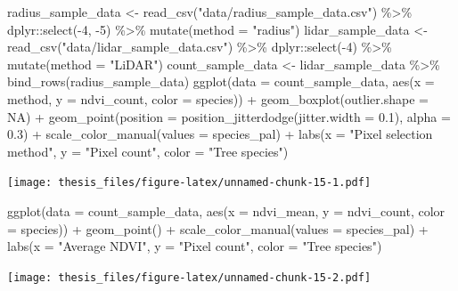 \documentclass[12pt,twoside]{reedthesis}
\newenvironment{Shaded}{\begin{snugshade}}{\end{snugshade}}
\newcommand{\AttributeTok}[1]{\textcolor[rgb]{0.77,0.63,0.00}{#1}}
\newcommand{\ConstantTok}[1]{\textcolor[rgb]{0.00,0.00,0.00}{#1}}
\newcommand{\DecValTok}[1]{\textcolor[rgb]{0.00,0.00,0.81}{#1}}
\newcommand{\FloatTok}[1]{\textcolor[rgb]{0.00,0.00,0.81}{#1}}
\newcommand{\FunctionTok}[1]{\textcolor[rgb]{0.00,0.00,0.00}{#1}}
\newcommand{\NormalTok}[1]{#1}
\newcommand{\OtherTok}[1]{\textcolor[rgb]{0.56,0.35,0.01}{#1}}
\newcommand{\SpecialCharTok}[1]{\textcolor[rgb]{0.00,0.00,0.00}{#1}}
\newcommand{\StringTok}[1]{\textcolor[rgb]{0.31,0.60,0.02}{#1}}
\begin{document}
\begin{Shaded}
\begin{Highlighting}[]
\NormalTok{radius\_sample\_data }\OtherTok{\textless{}{-}} \FunctionTok{read\_csv}\NormalTok{(}\StringTok{"data/radius\_sample\_data.csv"}\NormalTok{) }\SpecialCharTok{\%\textgreater{}\%}
\NormalTok{    dplyr}\SpecialCharTok{::}\FunctionTok{select}\NormalTok{(}\SpecialCharTok{{-}}\DecValTok{4}\NormalTok{, }\SpecialCharTok{{-}}\DecValTok{5}\NormalTok{) }\SpecialCharTok{\%\textgreater{}\%}
    \FunctionTok{mutate}\NormalTok{(}\AttributeTok{method =} \StringTok{"radius"}\NormalTok{)}
\NormalTok{lidar\_sample\_data }\OtherTok{\textless{}{-}} \FunctionTok{read\_csv}\NormalTok{(}\StringTok{"data/lidar\_sample\_data.csv"}\NormalTok{) }\SpecialCharTok{\%\textgreater{}\%}
\NormalTok{    dplyr}\SpecialCharTok{::}\FunctionTok{select}\NormalTok{(}\SpecialCharTok{{-}}\DecValTok{4}\NormalTok{) }\SpecialCharTok{\%\textgreater{}\%}
    \FunctionTok{mutate}\NormalTok{(}\AttributeTok{method =} \StringTok{"LiDAR"}\NormalTok{)}
\NormalTok{count\_sample\_data }\OtherTok{\textless{}{-}}\NormalTok{ lidar\_sample\_data }\SpecialCharTok{\%\textgreater{}\%}
    \FunctionTok{bind\_rows}\NormalTok{(radius\_sample\_data)}
\FunctionTok{ggplot}\NormalTok{(}\AttributeTok{data =}\NormalTok{ count\_sample\_data, }\FunctionTok{aes}\NormalTok{(}\AttributeTok{x =}\NormalTok{ method, }\AttributeTok{y =}\NormalTok{ ndvi\_count,}
    \AttributeTok{color =}\NormalTok{ species)) }\SpecialCharTok{+} \FunctionTok{geom\_boxplot}\NormalTok{(}\AttributeTok{outlier.shape =} \ConstantTok{NA}\NormalTok{) }\SpecialCharTok{+} \FunctionTok{geom\_point}\NormalTok{(}\AttributeTok{position =} \FunctionTok{position\_jitterdodge}\NormalTok{(}\AttributeTok{jitter.width =} \FloatTok{0.1}\NormalTok{),}
    \AttributeTok{alpha =} \FloatTok{0.3}\NormalTok{) }\SpecialCharTok{+} \FunctionTok{scale\_color\_manual}\NormalTok{(}\AttributeTok{values =}\NormalTok{ species\_pal) }\SpecialCharTok{+}
    \FunctionTok{labs}\NormalTok{(}\AttributeTok{x =} \StringTok{"Pixel selection method"}\NormalTok{, }\AttributeTok{y =} \StringTok{"Pixel count"}\NormalTok{, }\AttributeTok{color =} \StringTok{"Tree species"}\NormalTok{)}
\end{Highlighting}
\end{Shaded}
\texttt{[image: thesis\_files/figure-latex/unnamed-chunk-15-1.pdf]}
\begin{Shaded}
\begin{Highlighting}[]
\FunctionTok{ggplot}\NormalTok{(}\AttributeTok{data =}\NormalTok{ count\_sample\_data, }\FunctionTok{aes}\NormalTok{(}\AttributeTok{x =}\NormalTok{ ndvi\_mean, }\AttributeTok{y =}\NormalTok{ ndvi\_count,}
    \AttributeTok{color =}\NormalTok{ species)) }\SpecialCharTok{+} \FunctionTok{geom\_point}\NormalTok{() }\SpecialCharTok{+} \FunctionTok{scale\_color\_manual}\NormalTok{(}\AttributeTok{values =}\NormalTok{ species\_pal) }\SpecialCharTok{+}
    \FunctionTok{labs}\NormalTok{(}\AttributeTok{x =} \StringTok{"Average NDVI"}\NormalTok{, }\AttributeTok{y =} \StringTok{"Pixel count"}\NormalTok{, }\AttributeTok{color =} \StringTok{"Tree species"}\NormalTok{)}
\end{Highlighting}
\end{Shaded}
\texttt{[image: thesis\_files/figure-latex/unnamed-chunk-15-2.pdf]}
\end{document}
